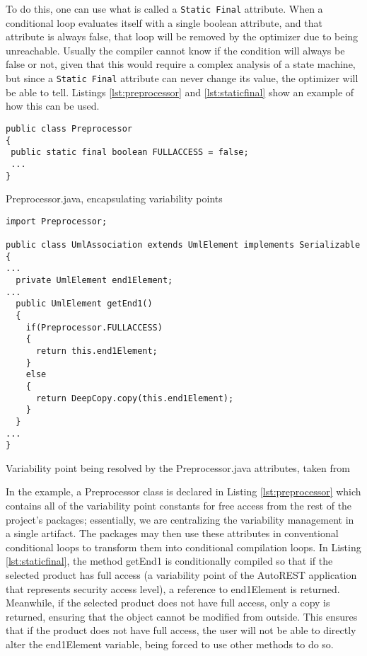To do this, one can use what is called a \lstinline{Static Final} attribute. When a conditional loop evaluates itself with a single boolean attribute, and that attribute is always false, that loop will be removed by the optimizer due to being unreachable. Usually the compiler cannot know if the condition will always be false or not, given that this would require a complex analysis of a state machine, but since a \lstinline{Static Final} attribute can never change its value, the optimizer will be able to tell. Listings \ref{lst:preprocessor} and \ref{lst:staticfinal} show an example of how this can be used.

\begin{listing}
\begin{verbatim}
public class Preprocessor
{
 public static final boolean FULLACCESS = false;
 ...
}
\end{verbatim}
\caption{Preprocessor.java, encapsulating variability points} \label{lst:preprocessor}
\end{listing}

\begin{listing}
\begin{verbatim}
import Preprocessor;

public class UmlAssociation extends UmlElement implements Serializable
{
...
  private UmlElement end1Element;
...
  public UmlElement getEnd1()
  {
    if(Preprocessor.FULLACCESS)
    {
      return this.end1Element;
    }
    else
    {
      return DeepCopy.copy(this.end1Element);
    }
  }
...
}
\end{verbatim}
\caption{Variability point being resolved by the Preprocessor.java attributes, taken from \cite{AUTOREST}} \label{lst:staticfinal}
\end{listing}

In the example, a Preprocessor class is declared in Listing \ref{lst:preprocessor} which contains all of the variability point constants for free access from the rest of the project's packages; essentially, we are centralizing the variability management in a single artifact. The packages may then use these attributes in conventional conditional loops to transform them into conditional compilation loops. In Listing \ref{lst:staticfinal}, the method getEnd1 is conditionally compiled so that if the selected product has full access (a \gls{variability} point of the AutoREST application \cite{AUTOREST} that represents security access level), a reference to end1Element is returned. Meanwhile, if the selected product does not have full access, only a copy is returned, ensuring that the object cannot be modified from outside. This ensures that if the product does not have full access, the user will not be able to directly alter the end1Element variable, being forced to use other methods to do so.

